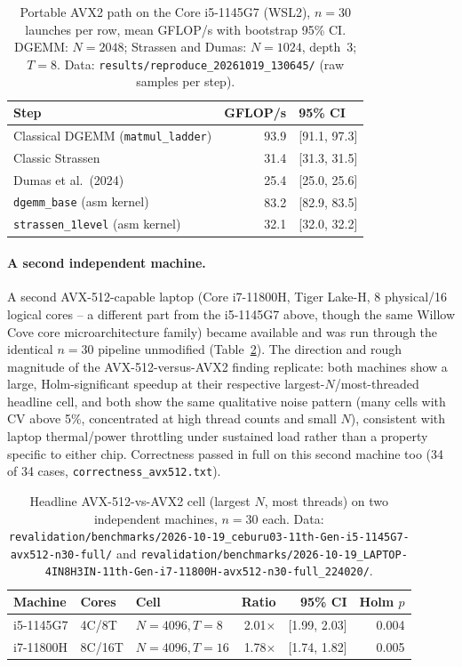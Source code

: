 \documentclass[acmsmall]{acmart}
\begin{document}
\begin{table}[h]
\centering
\small
\caption{Portable AVX2 path on the Core i5-1145G7 (WSL2), $n{=}30$
launches per row, mean GFLOP/s with bootstrap 95\% CI. DGEMM: $N{=}2048$;
Strassen and Dumas: $N{=}1024$, depth~3; $T{=}8$. Data:
\texttt{results/reproduce\_20261019\_130645/} (raw samples per step).}
\label{tab:repro-avx2}
\begin{tabular}{lrl}
\toprule
Step & GFLOP/s & 95\% CI \\
\midrule
Classical DGEMM (\texttt{matmul\_ladder}) & 93.9 & [91.1, 97.3] \\
Classic Strassen & 31.4 & [31.3, 31.5] \\
Dumas et al.\ (2024) & 25.4 & [25.0, 25.6] \\
\texttt{dgemm\_base} (asm kernel) & 83.2 & [82.9, 83.5] \\
\texttt{strassen\_1level} (asm kernel) & 32.1 & [32.0, 32.2] \\
\bottomrule
\end{tabular}
\end{table}

\paragraph{A second independent machine.}
A second AVX-512-capable laptop (Core i7-11800H, Tiger Lake-H, 8
physical/16 logical cores -- a different part from the i5-1145G7 above,
though the same Willow Cove core microarchitecture family) became
available and was run through the identical $n{=}30$ pipeline
unmodified (Table~\ref{tab:avx512-2machine}). The direction and rough
magnitude of the AVX-512-versus-AVX2 finding replicate: both machines
show a large, Holm-significant speedup at their respective
largest-$N$/most-threaded headline cell, and both show the same
qualitative noise pattern (many cells with CV above 5\%, concentrated at
high thread counts and small $N$), consistent with laptop thermal/power
throttling under sustained load rather than a property specific to
either chip. Correctness passed in full on this second machine too (34
of 34 cases, \texttt{correctness\_avx512.txt}).

\begin{table}[h]
\centering
\small
\caption{Headline AVX-512-vs-AVX2 cell (largest $N$, most threads) on
two independent machines, $n{=}30$ each. Data:
\texttt{revalidation/benchmarks/2026-10-19\_ceburu03-11th-Gen-i5-1145G7-avx512-n30-full/}
and
\texttt{revalidation/benchmarks/2026-10-19\_LAPTOP-4IN8H3IN-11th-Gen-i7-11800H-avx512-n30-full\_224020/}.}
\label{tab:avx512-2machine}
\begin{tabular}{lllrrr}
\toprule
Machine & Cores & Cell & Ratio & 95\% CI & Holm $p$ \\
\midrule
i5-1145G7 & 4C/8T  & $N{=}4096,T{=}8$  & 2.01$\times$ & [1.99, 2.03] & 0.004 \\
i7-11800H & 8C/16T & $N{=}4096,T{=}16$ & 1.78$\times$ & [1.74, 1.82] & 0.005 \\
\bottomrule
\end{tabular}
\end{table}
\end{document}
